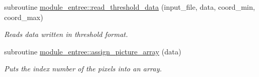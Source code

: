 \begin{DoxyCompactItemize}
subroutine \hyperlink{namespacemodule__entree_a25df009403bc610c2ef3b3a151574979}{module\+\_\+entree\+::read\+\_\+threshold\+\_\+data} (input\+\_\+file, data, coord\+\_\+min, coord\+\_\+max)
\begin{DoxyCompactList}\small\item\em Reads data written in threshold format. \end{DoxyCompactList}\item 
subroutine \hyperlink{namespacemodule__entree_a08bc5eb1225bf568c94df30b22f04e03}{module\+\_\+entree\+::assign\+\_\+picture\+\_\+array} (data)
\begin{DoxyCompactList}\small\item\em Puts the index number of the pixels into an array. \end{DoxyCompactList}\end{DoxyCompactItemize}
